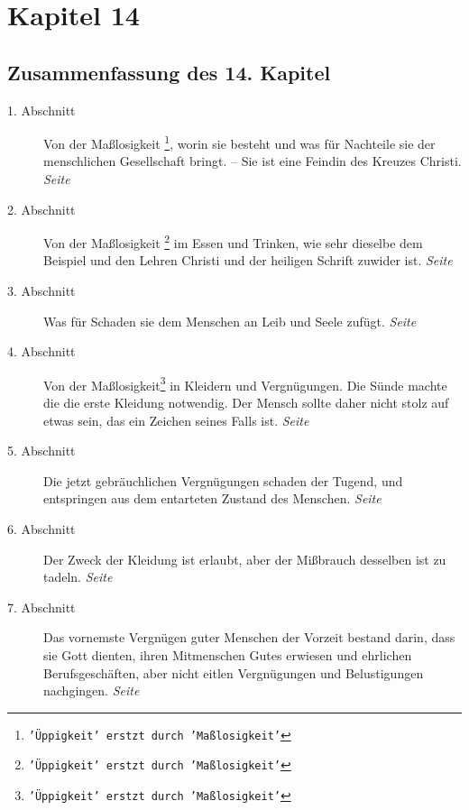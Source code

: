 
\chapter{Kapitel 14} \label{kap14}

\section{Zusammenfassung des 14. Kapitel}

\begin{description}
\item[1. Abschnitt] Von der Maßlosigkeit
\footnote{\texttt{'Üppigkeit' erstzt durch 'Maßlosigkeit'}},
worin sie besteht und was für Nachteile
sie der menschlichen Gesellschaft bringt. -- Sie ist eine Feindin des Kreuzes
Christi.
\dotfill \textit{Seite~\pageref{kap14_ab1}}\\
\item[2. Abschnitt] Von der Maßlosigkeit
\footnote{\texttt{'Üppigkeit' erstzt durch 'Maßlosigkeit'}}
im Essen und Trinken, wie sehr dieselbe
dem Beispiel und den Lehren Christi und der heiligen Schrift zuwider ist.
\dotfill \textit{Seite~\pageref{kap14_ab2}}\\
\item[3. Abschnitt] Was für Schaden sie dem Menschen an Leib und Seele zufügt.
\dotfill \textit{Seite~\pageref{kap14_ab3}}\\
\item[4. Abschnitt] Von der Maßlosigkeit\footnote{\texttt{'Üppigkeit' erstzt
durch 'Maßlosigkeit'}} in Kleidern und Vergnügungen. Die Sünde
machte die die erste Kleidung notwendig. Der Mensch sollte daher nicht stolz auf
etwas sein, das ein Zeichen seines Falls ist.
\dotfill \textit{Seite~\pageref{kap14_ab4}}\\
\item[5. Abschnitt] Die jetzt gebräuchlichen Vergnügungen schaden der Tugend,
und
entspringen aus dem entarteten Zustand des Menschen.
\dotfill \textit{Seite~\pageref{kap14_ab5}}\\
\item[6. Abschnitt] Der Zweck der Kleidung ist erlaubt, aber der Mißbrauch
desselben ist zu tadeln.
\dotfill \textit{Seite~\pageref{kap14_ab6}}\\
\item[7. Abschnitt] Das vornemste Vergnügen guter Menschen der Vorzeit bestand
darin, dass sie Gott dienten, ihren Mitmenschen Gutes erwiesen und ehrlichen
Berufsgeschäften, aber nicht eitlen Vergnügungen und Belustigungen nachgingen.
\dotfill \textit{Seite~\pageref{kap14_ab7}}\\

\end{description}
